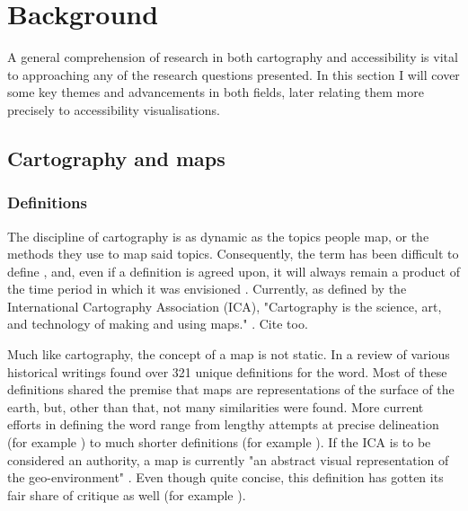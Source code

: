 \documentclass[12pt]{article}
\begin{document}
\section{Background}
A general comprehension of research in both cartography and accessibility is
vital to approaching any of the research questions presented.
In this section I will cover some key themes and advancements in both fields, %
later relating them more precisely to accessibility visualisations.


\subsection{Cartography and maps}

\subsubsection{Definitions}

The discipline of cartography is as dynamic as the topics people map,
or the methods they use to map said topics.
Consequently, the term has been difficult to define \parencite{kry1995},
and, even if a definition is agreed upon,
it will always remain a product of the time period
in which it was envisioned \parencite{tyn1992, and1996}.
Currently, as defined by the International Cartography Association (ICA), "Cartography is
the science, art, and technology of making and using maps."
\parencite{ica2019}. Cite \parencite{kra2017} too.  %

Much like cartography, the concept of a map is not static.
In a review of various historical writings \textcite{and1996}
found over 321 unique definitions for the word.
Most of these definitions shared the premise that
maps are representations of the surface of the earth,
but, other than that, not many similarities were found.
More current efforts in defining the word range
from lengthy attempts at precise delineation (for example \textcite{ica2003, })
to much shorter definitions (for example \textcite{}).
If the ICA is to be considered an authority, a map is currently
"an abstract visual representation of the geo-environment" \parencite{ica2019}.
Even though quite concise, this definition has gotten its fair share of critique as well
(for example \textcite{lap2021}).
\end{document}
